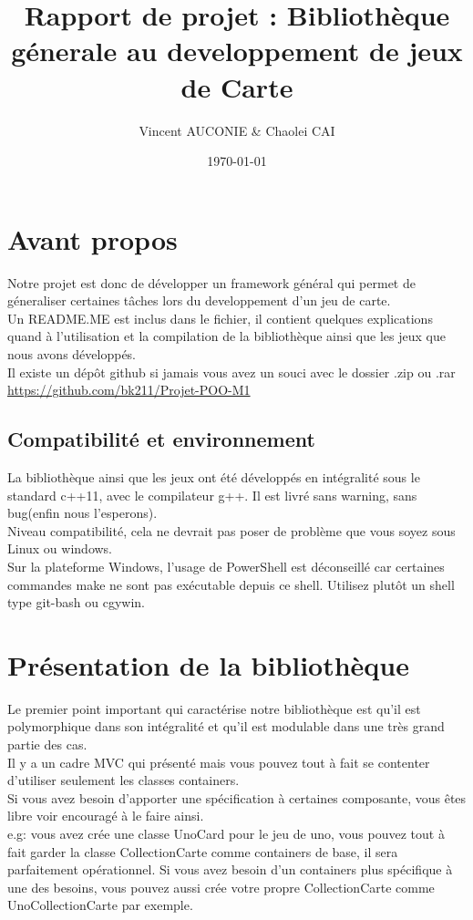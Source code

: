 \documentclass[12pt, letterpaper]{article}
\title{Rapport de projet : Bibliothèque génerale au developpement de jeux de Carte}
\author{Vincent AUCONIE \& Chaolei CAI
\\ 
  \multicolumn{1}{
      p{.7\textwidth}}{\centering\emph{Université de Paris \\
  UFR Informatique\\}
  M1 Informatique}
}
\date{\today}
\begin{document}
\begin{titlepage}
    \maketitle
\end{titlepage}

\tableofcontents

\section{Avant propos}
Notre projet est donc de développer un framework général qui permet de géneraliser certaines tâches lors 
du developpement d'un jeu de carte. \\
Un README.ME est inclus dans le fichier, il contient quelques explications quand à l'utilisation et la compilation de la bibliothèque ainsi que les jeux que 
nous avons développés.\\
Il existe un dépôt github si jamais vous avez un souci avec le dossier .zip ou .rar\\
\url{https://github.com/bk211/Projet-POO-M1}

\subsection{Compatibilité et environnement}
La bibliothèque ainsi que les jeux ont été développés en intégralité sous le standard c++11, avec le compilateur g++.
Il est livré sans warning, sans bug(enfin nous l'esperons).\\ 
Niveau compatibilité, cela ne devrait pas poser de problème que vous soyez sous Linux ou windows.\\
Sur la plateforme Windows, l'usage de PowerShell est déconseillé car certaines commandes make ne sont pas exécutable depuis ce shell. 
Utilisez plutôt un shell type git-bash ou cgywin.


\section{Présentation de la bibliothèque}
Le premier point important qui caractérise notre bibliothèque est qu'il est polymorphique dans son intégralité et qu'il est modulable dans une 
très grand partie des cas. \\
Il y a un cadre MVC qui présenté mais vous pouvez tout à fait se contenter d'utiliser seulement les classes containers.\\
Si vous avez besoin d'apporter une spécification à certaines composante, vous êtes libre voir encouragé à le faire ainsi.\\
e.g: vous avez crée une classe UnoCard pour le jeu de uno, vous pouvez tout à fait garder la classe CollectionCarte comme containers de base, 
il sera parfaitement opérationnel. Si vous avez besoin d'un containers plus spécifique à une des besoins, vous pouvez aussi crée votre propre CollectionCarte comme UnoCollectionCarte par exemple.
\end{document}
